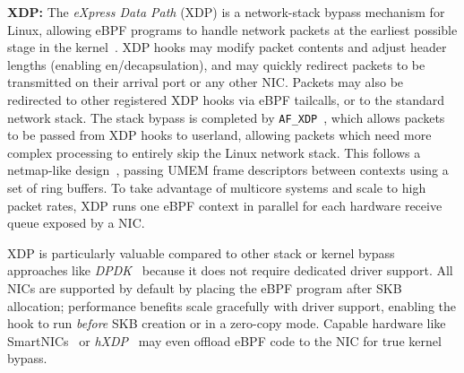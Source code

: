 \documentclass[comsoc, conference, times]{IEEEtran}
\newcommand{\afxdp}{\texttt{AF\_XDP}}
\newcommand{\fakepara}[1]{\noindent\textbf{#1:}}
\begin{document}
\fakepara{XDP}
The \emph{eXpress Data Path} (XDP) is a network-stack bypass mechanism for Linux, allowing eBPF programs to handle network packets at the earliest possible stage in the kernel~\parencite{DBLP:conf/conext/Hoiland-Jorgensen18}.
XDP hooks may modify packet contents and adjust header lengths (enabling en/decapsulation), and may quickly redirect packets to be transmitted on their arrival port or any other NIC.
Packets may also be redirected to other registered XDP hooks via eBPF tailcalls, or to the standard network stack.
The stack bypass is completed by \afxdp{}~\parencite{lwn-af-xdp}, which allows packets to be passed from XDP hooks to userland, allowing packets which need more complex processing to entirely skip the Linux network stack.
This follows a netmap-like design~\parencite{DBLP:conf/usenix/Rizzo12}, passing UMEM frame descriptors between contexts using a set of ring buffers.
To take advantage of multicore systems and scale to high packet rates, XDP runs one eBPF context in parallel for each hardware receive queue exposed by a NIC.

XDP is particularly valuable compared to other stack or kernel bypass approaches like \emph{DPDK}~\parencite{dpdk} because it does not require dedicated driver support.
All NICs are supported by default by placing the eBPF program after SKB allocation; performance benefits scale gracefully with driver support, enabling the hook to run \emph{before} SKB creation or in a zero-copy mode.
Capable hardware like SmartNICs~\parencite{netronome-smartnic} or \emph{hXDP}~\parencite{DBLP:conf/osdi/BrunellaBBPSBCP20} may even offload eBPF code to the NIC for true kernel bypass.


\end{document}
